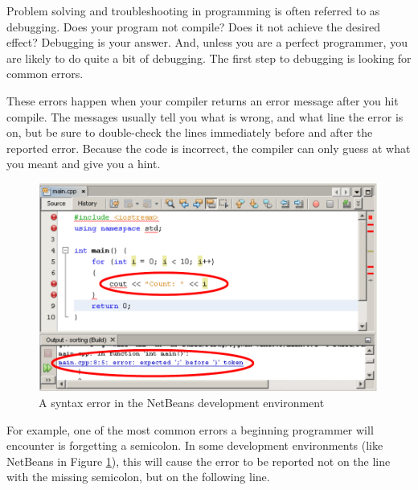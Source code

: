 
Problem solving and troubleshooting in programming is often referred to as debugging. 
Does your program not compile? 
Does it not achieve the desired effect? 
Debugging is your answer. 
And, unless you are a perfect programmer, you are likely to do quite a bit of debugging.
The first step to debugging is looking for common errors.


These errors happen when your compiler returns an error message after you hit compile. 
The messages usually tell you what is wrong, and what line the error is on, but be sure to double-check the lines immediately before and after the reported error. 
Because the code is incorrect, the compiler can only guess at what you meant and give you a hint.

\begin{figure}[tbh]
  \centering
  \includegraphics[width=\textwidth]{diagrams/fig-netbeans-syntax-error.pdf}
  \caption{A syntax error in the NetBeans development environment} \label{fig-netbeans-syntax-error} 
\end{figure}

For example, one of the most common errors a beginning programmer will encounter is forgetting a semicolon. 
In some development environments (like NetBeans in Figure \ref{fig-netbeans-syntax-error}), this will cause the error to be reported not on the line with the missing semicolon, but on the following line. 


